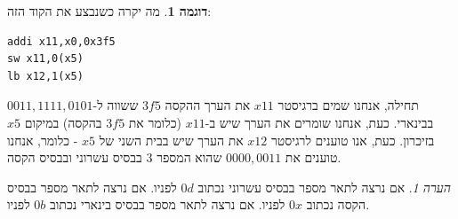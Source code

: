 \documentclass[12pt]{article}
\theoremstyle{plain}
\theoremstyle{definition}
\newtheorem{example}[theorem]{דוגמה}      %
\theoremstyle{remark}
\newtheorem*{remark}{הערה}                %
\begin{document}
\begin{example}
מה יקרה כשנבצע את הקוד הזה:\begin{LTR}\begin{lstlisting}[language=assembly]
addi x11,x0,0x3f5
sw x11,0(x5)
lb x12,1(x5)

\end{lstlisting}\end{LTR}תחילה, אנחנו שמים ברגיסטר \({x11}\) את הערך ההקסה \({3f5}\) ששווה ל-\({0011,1111,0101}\) בבינארי.\newline{}
כעת, אנחנו שומרים את הערך שיש ב-\({x11}\) (כלומר את \({3f5}\) בהקסה) במיקום \({x5}\) בזיכרון.\newline{}
כעת, אנו טוענים לרגיסטר \({x12}\) את הערך שיש בבית השני של \({x5}\) - כלומר, אנחנו טוענים את \({0000,0011}\) שהוא המספר \({3}\) בבסיס עשרוני ובבסיס הקסה.
\end{example}
\begin{remark}
אם נרצה לתאר מספר בבסיס עשרוני נכתוב \({0d}\) לפניו.\newline{}
אם נרצה לתאר מספר בבסיס הקסה נכתוב \({0x}\) לפניו.\newline{}
אם נרצה לתאר מספר בבסיס בינארי נכתוב \({0b}\) לפניו.
\end{remark}
\end{document}
